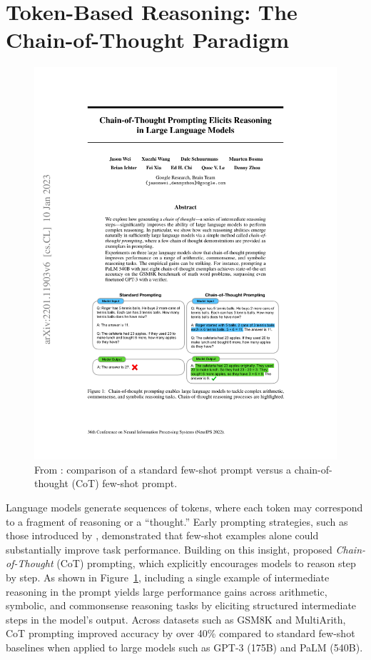 \documentclass[project]{bsu-cs}  %
\begin{document}
\section{Token-Based Reasoning: The Chain-of-Thought Paradigm}\label{sec:CoT}
% 
\begin{figure}
    \centering
    \includegraphics[width=0.8\linewidth]{figures/cot1.pdf}
    \caption{From \citet{DBLP:journals/corr/abs-2201-11903}: comparison of a standard few-shot prompt versus a chain-of-thought (CoT) few-shot prompt.}
    \label{fig:cot1}
\end{figure}
% 
Language models generate sequences of tokens, where each token may correspond to a fragment of reasoning or a “thought.” Early prompting strategies, such as those introduced by \citet{DBLP:journals/corr/abs-2005-14165}, demonstrated that few-shot examples alone could substantially improve task performance. Building on this insight, \citet{DBLP:journals/corr/abs-2201-11903} proposed \textit{Chain-of-Thought} (CoT) prompting, which explicitly encourages models to reason step by step. As shown in Figure~\ref{fig:cot1}, including a single example of intermediate reasoning in the prompt yields large performance gains across arithmetic, symbolic, and commonsense reasoning tasks by eliciting structured intermediate steps in the model’s output. Across datasets such as GSM8K and MultiArith, CoT prompting improved accuracy by over 40\% compared to standard few-shot baselines when applied to large models such as GPT-3 (175B) and PaLM (540B).
\end{document}
